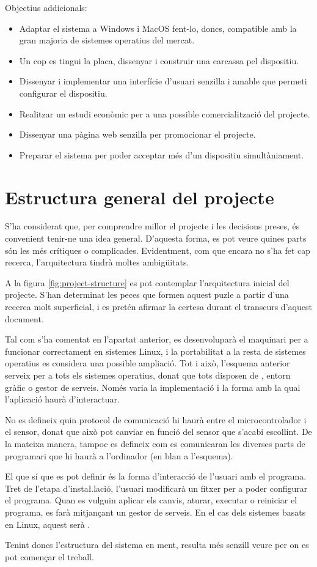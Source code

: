 Objectius addicionals:
\begin{itemize}
    \item Adaptar el sistema a Windows i MacOS fent-lo, doncs, compatible amb la
    gran majoria de sistemes operatius del mercat.
    \item Un cop es tingui la placa, dissenyar i construir una carcassa pel
    dispositiu.
    \item Dissenyar i implementar una interfície d'usuari senzilla i amable
    que permeti configurar el dispositiu.
    \item Realitzar un estudi econòmic per a una possible comercialització del
    projecte.
    \item Dissenyar una pàgina web senzilla per promocionar el projecte.
    \item Preparar el sistema per poder acceptar més d'un dispositiu
    simultàniament.
\end{itemize}

\section{Estructura general del projecte}

S'ha considerat que, per comprendre millor el projecte i les decisions preses,
és convenient tenir-ne una idea general. D'aquesta forma, es pot veure
quines parts són les més crítiques o complicades. Evidentment, com que encara no
s'ha fet cap recerca, l'arquitectura tindrà moltes ambigüitats.

A la figura \ref{fig:project-structure} es pot contemplar l'arquitectura inicial
del projecte. S'han determinat les peces que formen aquest puzle a partir d'una
recerca molt superficial, i es pretén afirmar la certesa durant el transcurs
d'aquest document.



Tal com s'ha comentat en l'apartat anterior, es desenvoluparà el maquinari per
a funcionar correctament en sistemes Linux, i la portabilitat a la resta de
sistemes operatius es considera una possible ampliació. Tot i això, l'esquema
anterior serveix per a tots els sistemes operatius, donat que tots disposen de
, entorn gràfic o gestor de serveis. Només varia la implementació i
la forma amb la qual l'aplicació haurà d'interactuar.

No es defineix quin protocol de comunicació hi haurà entre el microcontrolador
i el sensor, donat que això pot canviar en funció del sensor que s'acabi
escollint. De la mateixa manera, tampoc es defineix com es comunicaran les
diverses parts de programari que hi haurà a l'ordinador (en blau a l'esquema).

El que sí que es pot definir és la forma d'interacció de l'usuari amb el
programa. Tret de l'etapa d'insta\l.lació, l'usuari modificarà un fitxer per a
poder configurar el programa. Quan es vulguin aplicar els canvis, aturar,
executar o reiniciar el programa, es farà mitjançant un gestor de serveis. En el
cas dels sistemes basats en Linux, aquest serà .

Tenint doncs l'estructura del sistema en ment, resulta més senzill veure per on
es pot començar el treball.
